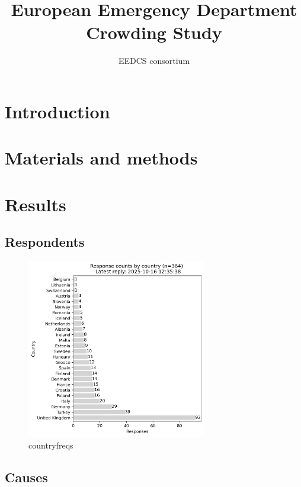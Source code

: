 \documentclass{article}
\title{European Emergency Department Crowding Study}
\author{EEDCS consortium}
\begin{document}
\maketitle

\begin{abstract}
    \lipsum[1]    
\end{abstract}

\section{Introduction}
\lipsum[1-8]
\section{Materials and methods}
\lipsum[9-12]
\section{Results}


\subsection{Respondents}
\lipsum[4-6]



\begin{figure}[H]
    \centering
        \includegraphics[width=0.7\textwidth]{../output/plots/country_freqs}
        \caption{countryfreqs}
        \label{fig:country_freqs}
\end{figure}

\subsection{Causes}
\lipsum[4-6]
\end{document}
